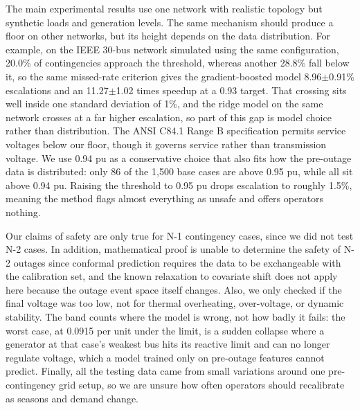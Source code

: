 \documentclass[conference]{IEEEtran}
\begin{document}
The main experimental results use one network with realistic topology but synthetic loads and generation levels. The same mechanism should produce a floor on other networks, but its height depends on the data distribution. For example, on the IEEE 30-bus network simulated using the same configuration, 20.0\% of contingencies approach the threshold, whereas another 28.8\% fall below it, so the same missed-rate criterion gives the gradient-boosted model 8.96$\pm$0.91\% escalations and an 11.27$\pm$1.02 times speedup at a 0.93 target. That crossing sits well inside one standard deviation of 1\%, and the ridge model on the same network crosses at a far higher escalation, so part of this gap is model choice rather than distribution. The ANSI C84.1 Range B specification \cite{ansi2020} permits service voltages below our floor, though it governs service rather than transmission voltage. We use 0.94 pu as a conservative choice that also fits how the pre-outage data is distributed: only 86 of the 1,500 base cases are above 0.95 pu, while all sit above 0.94 pu. Raising the threshold to 0.95 pu drops escalation to roughly 1.5\%, meaning the method flags almost everything as unsafe and offers operators nothing.

Our claims of safety are only true for N-1 contingency cases, since we did not test N-2 cases. In addition, mathematical proof is unable to determine the safety of N-2 outages since conformal prediction requires the data to be exchangeable with the calibration set, and the known relaxation to covariate shift \cite{tibshirani2019} does not apply here because the outage event space itself changes. Also, we only checked if the final voltage was too low, not for thermal overheating, over-voltage, or dynamic stability. The band counts where the model is wrong, not how badly it fails: the worst case, at 0.0915 per unit under the limit, is a sudden collapse where a generator at that case's weakest bus hits its reactive limit and can no longer regulate voltage, which a model trained only on pre-outage features cannot predict. Finally, all the testing data came from small variations around one pre-contingency grid setup, so we are unsure how often operators should recalibrate as seasons and demand change.
\end{document}
